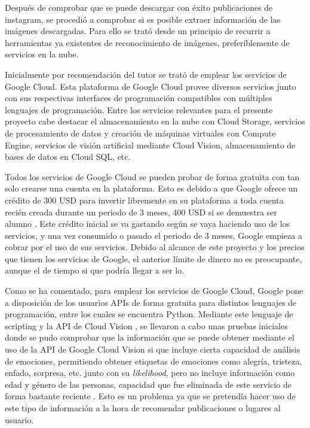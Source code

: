 Después de comprobar que se puede descargar con éxito publicaciones de instagram, se procedió a comprobar si es posible extraer información de las imágenes descargadas. Para ello se trató desde un principio de recurrir a herramientas ya existentes de reconocimiento de imágenes, preferiblemente de servicios en la nube.

Inicialmente por recomendación del tutor se trató de emplear los servicios de Google Cloud. Esta plataforma de Google Cloud provee diversos servicios junto con sus respectivas interfaces de programación compatibles con múltiples lenguajes de programación. Entre los servicios relevantes para el presente proyecto cabe destacar el almacenamiento en la nube con Cloud Storage, servicios de procesamiento de datos y creación de máquinas virtuales con Compute Engine, servicios de visión artificial mediante Cloud Vision, almacenamiento de bases de datos en Cloud SQL, etc.

Todos los servicios de Google Cloud se pueden probar de forma gratuita con tan solo crearse una cuenta en la plataforma. Esto es debido a que Google ofrece un crédito de 300 USD para invertir libremente en su plataforma a toda cuenta recién creada durante un periodo de 3 meses, 400 USD si se demuestra ser alumno \cite{google_cloud}. Este crédito inicial se va gastando según se vaya haciendo uso de los servicios, y una vez consumido o pasado el periodo de 3 meses, Google empieza a cobrar por el uso de sus servicios. Debido al alcance de este proyecto y los precios que tienen los servicios de Google, el anterior límite de dinero no es preocupante, aunque el de tiempo si que podría llegar a ser lo.

Como se ha comentado, para emplear los servicios de Google Cloud, Google pone a disposición de los usuarios APIs de forma gratuita para distintos lenguajes de programación, entre los cuales se encuentra Python. Mediante este lenguaje de scripting y la API de Cloud Vision \cite{api_google_vision}, se llevaron a cabo unas pruebas iniciales donde se pudo comprobar que la información que se puede obtener mediante el uso de la API de Google Cloud Vision si que incluye cierta capacidad de análisis de emociones, permitiendo obtener etiquetas de emociones como alegría, tristeza, enfado, sorpresa, etc. junto con su \textit{likelihood}, pero no incluye información como edad y género de las personas, capacidad que fue eliminada de este servicio de forma bastante reciente \cite{archive_google_gender}. Esto es un problema ya que se pretendía hacer uso de este tipo de información a la hora de recomendar publicaciones o lugares al usuario.

